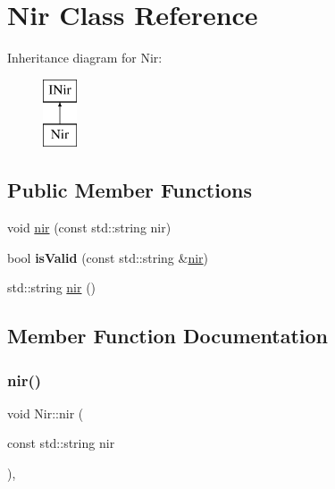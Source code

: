 \hypertarget{class_nir}{}\section{Nir Class Reference}
\label{class_nir}
Inheritance diagram for Nir\+:\begin{figure}[H]
\begin{center}
\leavevmode
\includegraphics[height=2.000000cm]{class_nir}
\end{center}
\end{figure}
\subsection*{Public Member Functions}
\begin{DoxyCompactItemize}
\item 
void \mbox{\hyperlink{class_nir_a09d504a9f4e4e6db933660a341cb33d1}{nir}} (const std\+::string nir)
\item 
\mbox{\label{class_nir_a32ebb63b28b24d113367d5785b7b946b}} 
bool {\bfseries is\+Valid} (const std\+::string \&\mbox{\hyperlink{class_nir_a09d504a9f4e4e6db933660a341cb33d1}{nir}})
\item 
std\+::string \mbox{\hyperlink{class_nir_a5611639ff318800e178396b0fca1a9f3}{nir}} ()
\end{DoxyCompactItemize}


\subsection{Member Function Documentation}
\mbox{\label{class_nir_a09d504a9f4e4e6db933660a341cb33d1}} 
\subsubsection{\texorpdfstring{nir()}{nir()}\hspace{0.1cm}{\footnotesize\ttfamily [1/2]}}
{\footnotesize\ttfamily void Nir\+::nir (\begin{DoxyParamCaption}\item[{const std\+::string}]{nir }\end{DoxyParamCaption})\hspace{0.3cm}{\ttfamily [inline]}, {\ttfamily [virtual]}}

